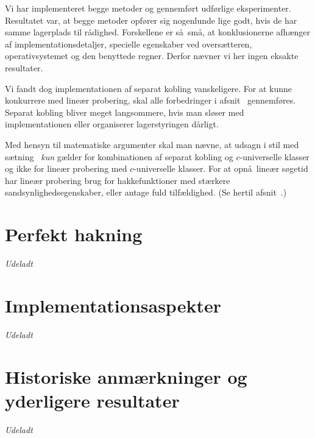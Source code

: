 Vi har implementeret begge metoder og gennemført udførlige eksperimenter.
Resultatet var, at begge metoder opfører sig nogenlunde lige godt, hvis de har samme lagerplads til rådighed.
Forskellene er så små, at konklusionerne afhænger af implementationsdetaljer, specielle egenskaber ved oversætteren, operativsystemet og den benyttede regner.
Derfor nævner vi her ingen eksakte resultater.

Vi fandt dog implementationen af separat kobling vanskeligere.
For at kunne konkurrere med lineær probering, skal alle forbedringer i afsnit~ gennemføres.
Separat kobling bliver meget langsommere, hvis man sløser med implementationen eller organiserer lagerstyringen dårligt.

Med hensyn til matematiske argumenter skal man nævne, at udsagn i stil med sætning~ \emph{kun} gælder for kombinationen af separat kobling og $c$-universelle klasser og ikke for lineær probering med $c$-universelle klasser.
For at opnå lineær søgetid har lineær probering brug for hakkefunktioner med stærkere sandsynlighedsegenskaber, eller antage fuld tilfældighed.
(Se hertil afsnit~.) 

\section{Perfekt hakning}

\emph{Udeladt}

\section{Implementationsaspekter}

\emph{Udeladt}

\section{Historiske anmærkninger og yderligere resultater}

\emph{Udeladt}

